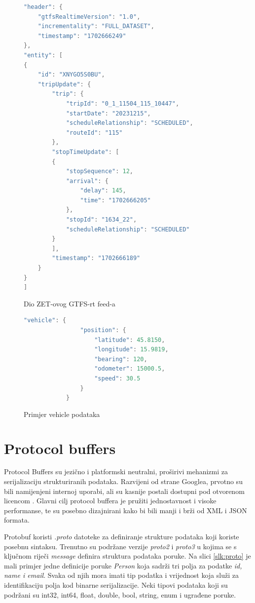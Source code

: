 \documentclass[zavrsnirad]{fer}
\begin{document}
\begin{figure}[H]
	\centering
	

	\begin{minipage}[htb]{0.58\linewidth}
		\centering
		
		\begin{lstlisting}[language=Java]
"header": {
	"gtfsRealtimeVersion": "1.0",
	"incrementality": "FULL_DATASET",
	"timestamp": "1702666249"
},
"entity": [
{
	"id": "XNYGO5S0BU",
	"tripUpdate": {
		"trip": {
			"tripId": "0_1_11504_115_10447",
			"startDate": "20231215",
			"scheduleRelationship": "SCHEDULED",
			"routeId": "115"
		},
		"stopTimeUpdate": [
		{
			"stopSequence": 12,
			"arrival": {
				"delay": 145,
				"time": "1702666205"
			},
			"stopId": "1634_22",
			"scheduleRelationship": "SCHEDULED"
		}
		],
		"timestamp": "1702666189"
	}
}
]
		\end{lstlisting} 
		\caption{Dio ZET-ovog GTFS-rt feed-a}
		\label{slk:reply1}
	\end{minipage}
	\hfill
	\begin{minipage}[htb]{0.38\linewidth}
		\centering
		\begin{lstlisting}[language=Java]
			"vehicle": {
				"position": {
					"latitude": 45.8150,
					"longitude": 15.9819,
					"bearing": 120,
					"odometer": 15000.5,
					"speed": 30.5
				}
			}
		\end{lstlisting}
		\caption{Primjer vehicle podataka}
		\label{slk:reply2}
	\end{minipage}
\end{figure}


\newpage
\chapter{Protocol buffers}
\label{sec:protobuf}

Protocol Buffers su jezično i platformski neutralni, proširivi mehanizmi za serijalizaciju strukturiranih podataka. Razvijeni od strane Googlea, prvotno su bili namijenjeni internoj uporabi, ali su kasnije postali dostupni pod otvorenom licencom \cite{protobuf}. Glavni cilj protocol buffera je pružiti jednostavnost i visoke performanse, te su posebno dizajnirani kako bi bili manji i brži od XML i JSON formata.


Protobuf koristi \textit{.proto} datoteke za definiranje strukture podataka koji koriste posebnu sintaksu. Trenutno su podržane verzije \textit{proto2} i \textit{proto3} u kojima se s ključnom riječi \textit{message} definira struktura podataka poruke. Na slici \ref{slk:proto} je mali primjer jedne definicije poruke \textit{Person} koja sadrži tri polja za podatke \textit{id, name i email}. Svaka od njih mora imati tip podatka i vrijednost koja služi za identifikaciju polja kod binarne serijalizacije. Neki tipovi podataka koji su podržani su int32, int64, float, double, bool, string, enum i ugrađene poruke.
\end{document}
